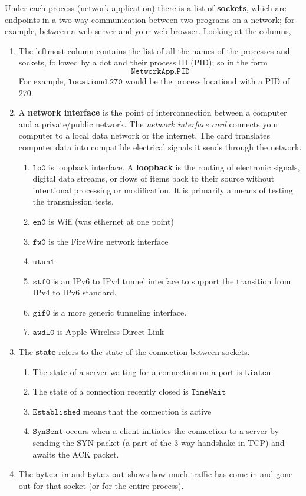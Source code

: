 \documentclass{article}
\begin{document}
  Under each process (network application) there is a list of \textbf{sockets}, which are endpoints in a two-way communication between two programs on a network; for example, between a web server and your web browser. Looking at the columns, 
  \begin{enumerate}
      \item The leftmost column contains the list of all the names of the processes and sockets, followed by a dot and their process ID (PID); so in the form
      \[\texttt{NetworkApp.PID}\]
      For example, $\texttt{locationd.270}$ would be the process locationd with a PID of 270. 
      \item A \textbf{network interface} is the point of interconnection between a computer and a private/public network. The \textit{network interface card} connects your computer to a local data network or the internet. The card translates computer data into compatible electrical signals it sends through the network. 
      \begin{enumerate}
          \item $\texttt{lo0}$ is loopback interface. A \textbf{loopback} is the routing of electronic signals, digital data streams, or flows of items back to their source without intentional processing or modification. It is primarily a means of testing the transmission tests. 
          \item $\texttt{en0}$ is Wifi (was ethernet at one point)
          \item $\texttt{fw0}$ is the FireWire network interface 
          \item $\texttt{utun1}$
          \item $\texttt{stf0}$ is an IPv6 to IPv4 tunnel interface to support the transition from IPv4 to IPv6 standard. 
          \item $\texttt{gif0}$ is a more generic tunneling interface. 
          \item $\texttt{awdl0}$ is Apple Wireless Direct Link
      \end{enumerate}
      \item The \textbf{state} refers to the state of the connection between sockets. 
      \begin{enumerate}
          \item The state of a server waiting for a connection on a port is $\texttt{Listen}$
          \item The state of a connection recently closed is $\texttt{TimeWait}$ 
          \item $\texttt{Established}$ means that the connection is active
          \item $\texttt{SynSent}$ occurs when a client initiates the connection to a server by sending the SYN packet (a part of the 3-way handshake in TCP) and awaits the ACK packet. 
      \end{enumerate}
      \item The $\texttt{bytes\_in}$ and $\texttt{bytes\_out}$ shows how much traffic has come in and gone out for that socket (or for the entire process).
  \end{enumerate}
\end{document}
